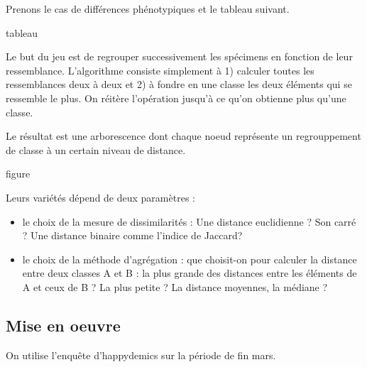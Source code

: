 \documentclass[
]{book}
\newenvironment{Shaded}{\begin{snugshade}}{\end{snugshade}}
\newcommand{\DataTypeTok}[1]{\textcolor[rgb]{0.13,0.29,0.53}{#1}}
\newcommand{\DecValTok}[1]{\textcolor[rgb]{0.00,0.00,0.81}{#1}}
\newcommand{\KeywordTok}[1]{\textcolor[rgb]{0.13,0.29,0.53}{\textbf{#1}}}
\newcommand{\NormalTok}[1]{#1}
\newcommand{\OperatorTok}[1]{\textcolor[rgb]{0.81,0.36,0.00}{\textbf{#1}}}
\newcommand{\StringTok}[1]{\textcolor[rgb]{0.31,0.60,0.02}{#1}}
\providecommand{\tightlist}{%
  \setlength{\itemsep}{0pt}\setlength{\parskip}{0pt}}
\begin{document}
Prenons le cas de différences phénotypiques et le tableau suivant.

tableau

Le but du jeu est de regrouper successivement les spécimens en fonction de leur ressemblance. L'algorithme consiste simplement à 1) calculer toutes les ressemblances deux à deux et 2) à fondre en une classe les deux éléments qui se ressemble le plus. On réitère l'opération jusqu'à ce qu'on obtienne plus qu'une classe.

Le résultat est une arborescence dont chaque noeud représente un regrouppement de classe à un certain niveau de distance.

figure

Leurs variétés dépend de deux paramètres :

\begin{itemize}
\tightlist
\item
  le choix de la mesure de dissimilarités : Une distance euclidienne ? Son carré ? Une distance binaire comme l'indice de Jaccard?
\item
  le choix de la méthode d'agrégation : que choisit-on pour calculer la distance entre deux classes A et B : la plus grande des distances entre les éléments de A et ceux de B ? La plus petite ? La distance moyennes, la médiane ?
\end{itemize}

\hypertarget{mise-en-oeuvre}{%
\subsection{Mise en oeuvre}\label{mise-en-oeuvre}}

On utilise l'enquête d'happydemics sur la période de fin mars.

\begin{Shaded}
\end{Shaded}
\end{document}

